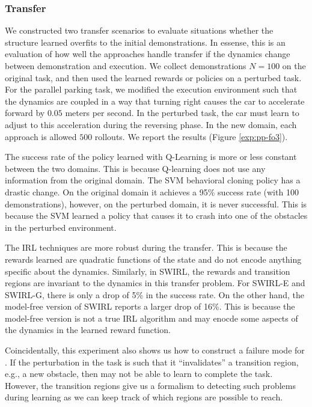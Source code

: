 \subsubsection{Transfer}
We constructed two transfer scenarios to evaluate situations whether the structure learned overfits to the initial demonstrations. In essense, this is an evaluation of how well the approaches handle transfer if the dynamics change between demonstration and execution.
We collect demonstrations $N=100$ on the original task, and then used the learned rewards or policies on a perturbed task.
For the parallel parking task, we modified the execution environment such that the dynamics are coupled in a way that turning right causes the car to accelerate forward by $0.05$ meters per second.
In the perturbed task, the car must learn to adjust to this acceleration during the reversing phase.
In the new domain, each approach is allowed $500$ rollouts. 
We report the results (Figure \ref{exp:pp-fo3}).

The success rate of the policy learned with Q-Learning is more or less constant between the two domains.
This is because Q-learning does not use any information from the original domain.
The SVM behavioral cloning policy has a drastic change.
On the original domain it achieves a 95\% success rate (with 100 demonstrations), however, on the perturbed domain, it is never successful.
This is because the SVM learned a policy that causes it to crash into one of the obstacles in the perturbed environment.

The IRL techniques are more robust during the transfer.
This is because the rewards learned are quadratic functions of the state and do not encode anything specific about the dynamics.
Similarly, in SWIRL, the rewards and transition regions are invariant to the dynamics in this transfer problem.
For SWIRL-E and SWIRL-G, there is only a drop of 5\% in the success rate.
On the other hand, the model-free version of SWIRL reports a larger drop of 16\%.
This is because the model-free version is not a true IRL algorithm and may enocde some aspects of the dynamics in the learned reward function.

Coincidentally, this experiment also shows us how to construct a failure mode for \hirl.
If the perturbation in the task is such that it ``invalidates'' a transition region, e.g., a new obstacle, then \hirl may not be able to learn to complete the task.
However, the transition regions give us a formalism to detecting such problems during learning as we can keep track of which regions are possible to reach.



